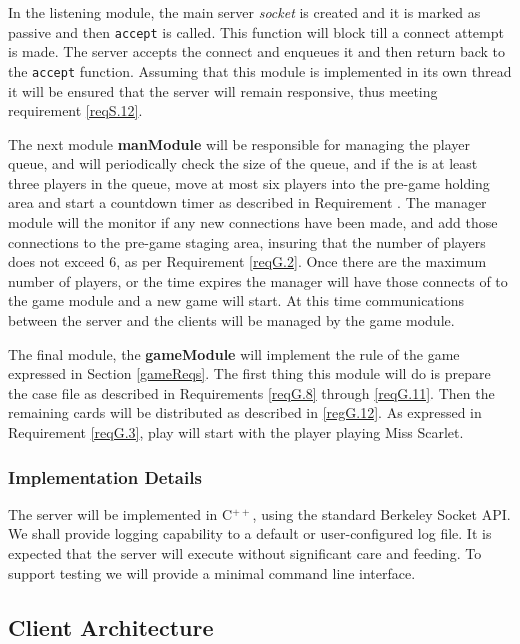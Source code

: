 \documentclass[10pt]{article}
\begin{document}
In the listening module, the main server {\em socket} is created and it is marked as passive and then \texttt{accept} is called.  This function will block till a connect attempt is made.  The server accepts the connect and enqueues it and then return back to the \texttt{accept} function.  Assuming that this module is implemented in its own thread it will be ensured that the server will remain responsive, thus meeting requirement \ref{reqS.12}.  
\par
The next module \textbf{manModule} will be responsible for managing the player queue, and will periodically check the size of the queue, and if the is at least three players in the queue, move at most six players into the pre-game holding area and start a countdown timer as described in Requirement \label{reqS.4}.  The manager module will the monitor if any new connections have been made, and add those connections to the pre-game staging area, insuring that the number of players does not exceed 6, as per Requirement \ref{reqG.2}.  Once there are the maximum number of players, or the time expires the manager will have those connects of to the game module and a new game will start.  At this time communications between the server and the clients will be managed by the game module.
\par
The final module, the \textbf{gameModule} will implement the rule of the game expressed in Section \ref{gameReqs}.  The first thing this module will do is prepare the case file as described in Requirements \ref{reqG.8} through \ref{reqG.11}.  Then the remaining cards will be distributed as described in \ref{regG.12}.  As expressed in Requirement \ref{reqG.3}, play will start with the player playing Miss Scarlet.

\subsubsection[Implementation Details]{Implementation Details}
The server will be implemented in C$^{++}$, using the standard Berkeley Socket API.  We shall provide logging capability to a default or user-configured log file.  It is expected that the server will execute without significant care and feeding.  To support testing we will provide a minimal command line interface.

\subsection[Client Architecture]{Client Architecture}
\end{document}
